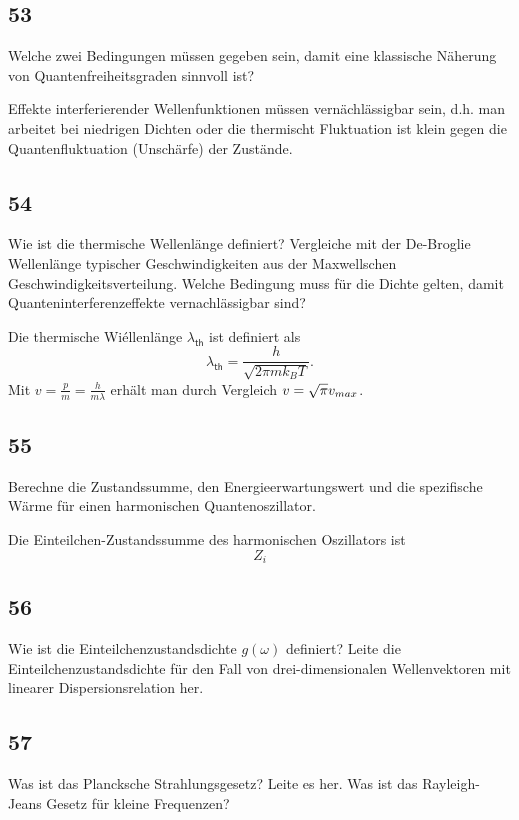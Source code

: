 \subsection{53}
\begin{myfrag}
Welche zwei Bedingungen müssen gegeben sein, damit eine klassische
Näherung von Quantenfreiheitsgraden sinnvoll ist?
\end{myfrag}
Effekte interferierender Wellenfunktionen müssen vernächlässigbar sein, d.h. man arbeitet bei niedrigen Dichten oder die thermischt Fluktuation ist klein gegen die Quantenfluktuation (Unschärfe) der Zustände.
\subsection{54}
\begin{myfrag}
Wie ist die thermische Wellenlänge definiert? Vergleiche mit der De-Broglie
Wellenlänge typischer Geschwindigkeiten aus der Maxwellschen
Geschwindigkeitsverteilung. Welche Bedingung muss für die Dichte gelten,
damit Quanteninterferenzeffekte vernachlässigbar sind?
\end{myfrag}
Die thermische Wiéllenlänge $\lambda_\mathsf{th}$ ist definiert als
\begin{equation}
	\lambda_\mathsf{th}=\frac{h}{\sqrt{2\pi mk_BT}}.
\end{equation}
Mit $v=\frac{p}{m}=\frac{h}{m\lambda}$ erhält man durch Vergleich $v=\sqrt{\pi}v_{max}$.
\subsection{55}
\begin{myfrag}
Berechne die Zustandssumme, den Energieerwartungswert und die
spezifische Wärme für einen harmonischen Quantenoszillator.
\end{myfrag}
Die Einteilchen-Zustandssumme des harmonischen Oszillators ist
\begin{equation}
	Z_i
\end{equation}
\subsection{56}
\begin{myfrag}
Wie ist die Einteilchenzustandsdichte $g(\omega )$ definiert? Leite die
Einteilchenzustandsdichte für den Fall von drei-dimensionalen
Wellenvektoren mit linearer Dispersionsrelation her.
\end{myfrag}
\subsection{57}
\begin{myfrag}
Was ist das Plancksche Strahlungsgesetz? Leite es her. Was ist das
Rayleigh-Jeans Gesetz für kleine Frequenzen?
\end{myfrag}
